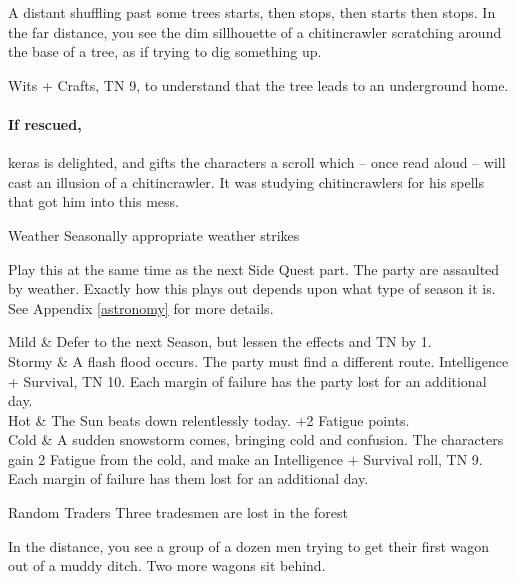 \begin{multicols}{2}
\begin{boxtext}

	A distant shuffling past some trees starts, then stops, then starts then stops.
	In the far distance, you see the dim sillhouette of a chitincrawler scratching around the base of a tree, as if trying to dig something up.

\end{boxtext}

Wits + Crafts, TN 9, to understand that the tree leads to an underground home.

\chitincrawler

\keras

\paragraph{If rescued,}
\gls{keras} is delighted, and gifts the characters a scroll which -- once read aloud -- will cast an illusion of a chitincrawler.  It was studying chitincrawlers for his spells that got him into this mess.

{Weather}%
{Seasonally appropriate weather strikes}%

Play this at the same time as the next Side Quest part.
The party are assaulted by weather.
Exactly how this plays out depends upon what type of season it is.
See Appendix \ref{astronomy} for more details.

\begin{rollchart}

	Mild & Defer to the next Season, but lessen the effects and TN by 1. \\
	Stormy & A flash flood occurs.  The party must find a different route.  Intelligence + Survival, TN 10.  Each margin of failure has the party lost for an additional day. \\
	Hot & The Sun beats down relentlessly today.  +2 Fatigue points. \\
	Cold & A sudden snowstorm comes, bringing cold and confusion.  The characters gain 2 Fatigue from the cold, and make an Intelligence + Survival roll, TN 9.  Each margin of failure has them lost for an additional day.

\end{rollchart}

{Random Traders}%
{Three tradesmen are lost in the forest}%

\begin{boxtext}
	In the distance, you see a group of a dozen men trying to get their first wagon out of a muddy ditch.  Two more wagons sit behind.
\end{boxtext}


\end{multicols}
